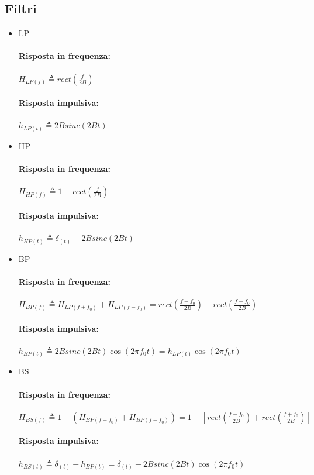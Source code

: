     \subsection{Filtri}
        \begin{itemize}
            \item {LP
                \paragraph{Risposta in frequenza:}
                    $H_{LP(f)}\triangleq rect\left(\frac{f}{2B}\right)  $
                \paragraph{Risposta impulsiva:}
                    $h_{LP(t)}\triangleq 2Bsinc(2Bt)  $
            }
            \item {HP
                \paragraph{Risposta in frequenza:}
                   $ H_{HP(f)}\triangleq 1 - rect\left(\frac{f}{2B}\right)  $
                \paragraph{Risposta impulsiva:}
                    $h_{HP(t)}\triangleq \delta_{(t)} - 2Bsinc(2Bt)  $
            }
            \item {BP
                \paragraph{Risposta in frequenza:}
                  $  H_{BP(f)}\triangleq H_{LP(f+f_0)} +H_{LP(f-f_0)} =  rect\left(\frac{f-f_0}{2B}\right) + rect\left(\frac{f+f_0}{2B}\right)  $
                \paragraph{Risposta impulsiva:}
                    $h_{BP(t)}\triangleq 2Bsinc(2Bt) \cos(2\pi f_0t) = h_{LP(t)}\cos(2\pi f_0t)   $
            }
            \item {BS
                \paragraph{Risposta in frequenza:}
                  $  H_{BS(f)}\triangleq 1 -(H_{BP(f+f_0)} +H_{BP(f-f_0)}) = 1- \left[ rect\left(\frac{f-f_0}{2B}\right) + rect\left(\frac{f+f_0}{2B}\right)\right]  $
                \paragraph{Risposta impulsiva:}
                    $h_{BS(t)}\triangleq \delta_{(t)} - h_{BP(t)} = \delta_{(t)} - 2Bsinc(2Bt) \cos(2\pi f_0t)$
            }
        \end{itemize}
